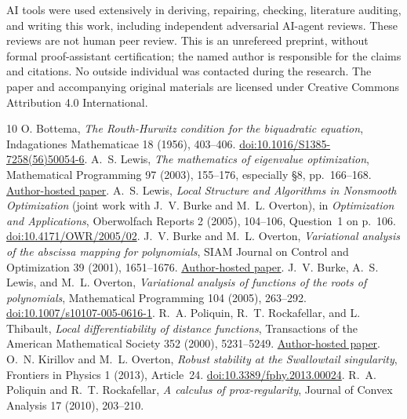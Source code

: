 \documentclass[11pt]{article}
\theoremstyle{remark}\newtheorem{remark}[theorem]{Remark}
\begin{document}
AI tools were used extensively in deriving, repairing, checking, literature
auditing, and writing this work, including independent adversarial AI-agent
reviews. These reviews are not human peer review. This is an unrefereed
preprint, without formal proof-assistant certification; the named author
is responsible for the claims and citations. No outside individual was
contacted during the research. The paper and accompanying original materials
are licensed under Creative Commons Attribution 4.0 International.

\begin{thebibliography}{10}
 O. Bottema, \emph{The Routh-Hurwitz condition for the
biquadratic equation}, Indagationes Mathematicae 18 (1956), 403--406.
\href{https://doi.org/10.1016/S1385-7258(56)50054-6}{doi:10.1016/S1385-7258(56)50054-6}.
 A.~S. Lewis, \emph{The mathematics of eigenvalue
optimization}, Mathematical Programming 97 (2003), 155--176, especially
\S8, pp.~166--168.
\href{https://people.orie.cornell.edu/aslewis/publications/03-mathematics.pdf}{Author-hosted paper}.
 A.~S. Lewis, \emph{Local Structure and Algorithms in Nonsmooth
Optimization} (joint work with J.~V. Burke and M.~L. Overton), in
\emph{Optimization and Applications}, Oberwolfach Reports 2 (2005),
104--106, Question~1 on p.~106.
\href{https://doi.org/10.4171/OWR/2005/02}{doi:10.4171/OWR/2005/02}.
 J.~V. Burke and M.~L. Overton, \emph{Variational analysis of
the abscissa mapping for polynomials}, SIAM Journal on Control and
Optimization 39 (2001), 1651--1676.
\href{https://sites.math.washington.edu/~burke/papers/reprints/37-va-abs-poly.pdf}{Author-hosted paper}.
 J.~V. Burke, A.~S. Lewis, and M.~L. Overton,
\emph{Variational analysis of functions of the roots of polynomials},
Mathematical Programming 104 (2005), 263--292.
\href{https://doi.org/10.1007/s10107-005-0616-1}{doi:10.1007/s10107-005-0616-1}.
 R.~A. Poliquin, R.~T. Rockafellar, and L. Thibault,
\emph{Local differentiability of distance functions}, Transactions of the
American Mathematical Society 352 (2000), 5231--5249.
\href{https://sites.math.washington.edu/~rtr/papers/rtr170-LocalDiffDistance.pdf}{Author-hosted paper}.
 O.~N. Kirillov and M.~L. Overton, \emph{Robust stability at
the Swallowtail singularity}, Frontiers in Physics 1 (2013), Article~24.
\href{https://doi.org/10.3389/fphy.2013.00024}{doi:10.3389/fphy.2013.00024}.
 R.~A. Poliquin and R.~T. Rockafellar, \emph{A calculus of
prox-regularity}, Journal of Convex Analysis 17 (2010), 203--210.

\end{thebibliography}
\end{document}
